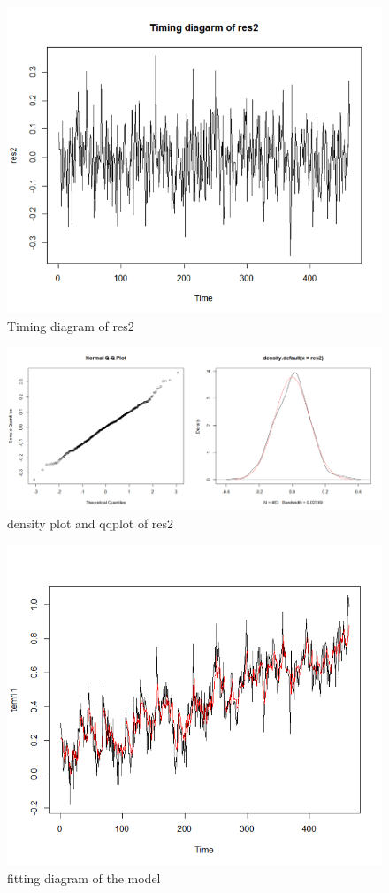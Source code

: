 \documentclass[a4paper,11pt]{article}
\begin{document}
\begin{figure}[H]
\centering
\caption{Timing diagram of res2}
\includegraphics[scale=.80]{Picture8.png}
\end{figure}

\begin{figure}[H]
\centering
\caption{density plot and qqplot of res2}
\includegraphics[scale=.80]{Picture9.png}
\end{figure}

\begin{figure}[H]
\centering
\caption{fitting diagram of the model}
\includegraphics[scale=.80]{Picture10.png}
\end{figure}
\end{document}
